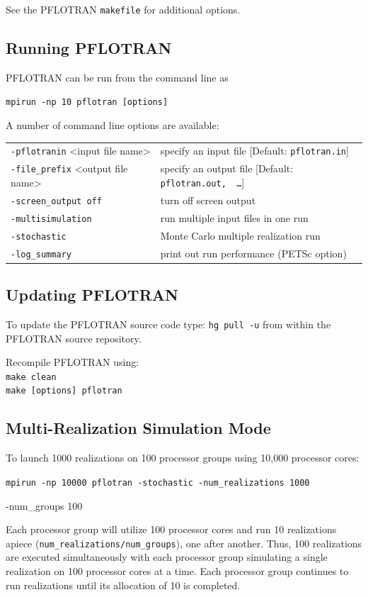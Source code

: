 \documentclass[12pt]{article}
\begin{document}
\noindent
See the PFLOTRAN \verb|makefile| for additional options.

\subsection{Running PFLOTRAN}

PFLOTRAN can be run from the command line as

\verb|mpirun -np 10 pflotran [options]|

A number of command line options are available:

\begin{tabular}{ll}
{\tt -pflotranin} <input file name> & specify an input file [Default: {\tt pflotran.in}]\\
{\tt -file\_prefix} <output file name> & specify an output file [Default: {\tt pflotran.out, \,\ldots}]\\
{\tt -screen\_output off} & turn off screen output\\
{\tt -multisimulation} & run multiple input files in one run\\
{\tt -stochastic} & Monte Carlo multiple realization run\\
{\tt -log\_summary} & print out run performance (PETSc option)
\end{tabular}

\subsection*{Updating PFLOTRAN}

To update the PFLOTRAN source code
type: {\tt hg pull -u} from within the PFLOTRAN source repository.

\noindent
Recompile PFLOTRAN using:\\
\indent
{\tt make clean}\\
\indent
{\tt make [options] pflotran}

\subsection*{Multi-Realization Simulation Mode}

To launch 1000 realizations on 100 processor groups using 10,000 processor cores:

\noindent
{\tt mpirun -np 10000 pflotran -stochastic -num\_realizations 1000 

-num\_groups 100}

Each processor group will utilize 100 processor cores and run 10 realizations apiece \linebreak ({\tt num\_realizations/num\_groups}), one after another. Thus, 100 realizations are executed simultaneously with each processor group simulating a single realization on 100 processor cores at a time. Each processor group continues to run realizations until its allocation of 10 is completed.
\end{document}
